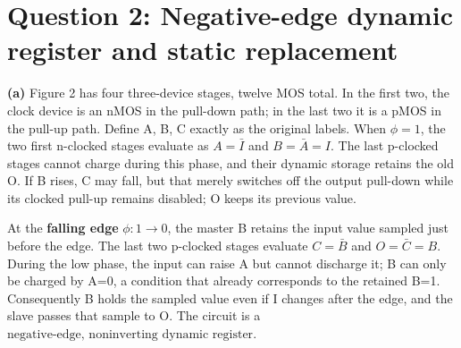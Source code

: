 \documentclass[10pt]{article}
\begin{document}
\newpage\section*{Question 2: Negative-edge dynamic register and static replacement}
\textbf{(a)} Figure 2 has four three-device stages, twelve MOS total. In the first two, the clock device is an nMOS in the pull-down path; in the last two it is a pMOS in the pull-up path. Define A, B, C exactly as the original labels.
When $\phi=1$, the two first n-clocked stages evaluate as $A=\bar I$ and $B=\bar A=I$. The last p-clocked stages cannot charge during this phase, and their dynamic storage retains the old O. If B rises, C may fall, but that merely switches off the output pull-down while its clocked pull-up remains disabled; O keeps its previous value.

At the \textbf{falling edge} $\phi:1\to0$, the master B retains the input value sampled just before the edge. The last two p-clocked stages evaluate $C=\bar B$ and $O=\bar C=B$. During the low phase, the input can raise A but cannot discharge it; B can only be charged by A=0, a condition that already corresponds to the retained B=1. Consequently B holds the sampled value even if I changes after the edge, and the slave passes that sample to O. The circuit is a $\boxed{\text{negative-edge, noninverting dynamic register}}$.
\end{document}
